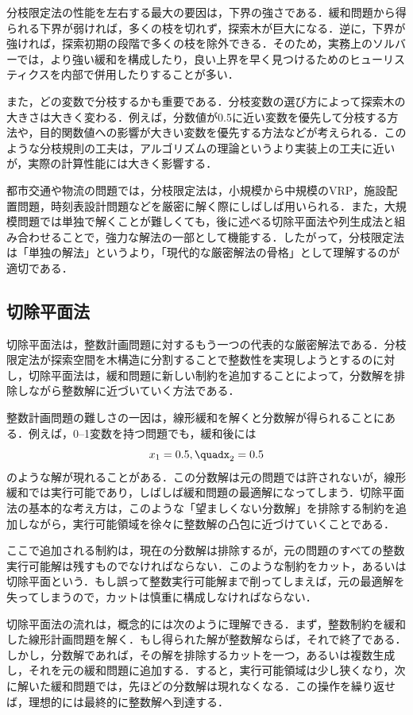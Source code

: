 分枝限定法の性能を左右する最大の要因は，下界の強さである．緩和問題から得られる下界が弱ければ，多くの枝を切れず，探索木が巨大になる．逆に，下界が強ければ，探索初期の段階で多くの枝を除外できる．そのため，実務上のソルバーでは，より強い緩和を構成したり，良い上界を早く見つけるためのヒューリスティクスを内部で併用したりすることが多い．

また，どの変数で分枝するかも重要である．分枝変数の選び方によって探索木の大きさは大きく変わる．例えば，分数値が0.5に近い変数を優先して分枝する方法や，目的関数値への影響が大きい変数を優先する方法などが考えられる．このような分枝規則の工夫は，アルゴリズムの理論というより実装上の工夫に近いが，実際の計算性能には大きく影響する．

都市交通や物流の問題では，分枝限定法は，小規模から中規模のVRP，施設配置問題，時刻表設計問題などを厳密に解く際にしばしば用いられる．また，大規模問題では単独で解くことが難しくても，後に述べる切除平面法や列生成法と組み合わせることで，強力な解法の一部として機能する．したがって，分枝限定法は「単独の解法」というより，「現代的な厳密解法の骨格」として理解するのが適切である．

\subsection{切除平面法}

切除平面法は，整数計画問題に対するもう一つの代表的な厳密解法である\cite{gomory1963}．分枝限定法が探索空間を木構造に分割することで整数性を実現しようとするのに対し，切除平面法は，緩和問題に新しい制約を追加することによって，分数解を排除しながら整数解に近づいていく方法である．

整数計画問題の難しさの一因は，線形緩和を解くと分数解が得られることにある．例えば，0--1変数を持つ問題でも，緩和後には
\begin{equation}
x_1=0.5,\quadx_2=0.5
\end{equation}
のような解が現れることがある．この分数解は元の問題では許されないが，線形緩和では実行可能であり，しばしば緩和問題の最適解になってしまう．切除平面法の基本的な考え方は，このような「望ましくない分数解」を排除する制約を追加しながら，実行可能領域を徐々に整数解の凸包に近づけていくことである．

ここで追加される制約は，現在の分数解は排除するが，元の問題のすべての整数実行可能解は残すものでなければならない．このような制約をカット，あるいは切除平面という．もし誤って整数実行可能解まで削ってしまえば，元の最適解を失ってしまうので，カットは慎重に構成しなければならない．

切除平面法の流れは，概念的には次のように理解できる．まず，整数制約を緩和した線形計画問題を解く．もし得られた解が整数解ならば，それで終了である．しかし，分数解であれば，その解を排除するカットを一つ，あるいは複数生成し，それを元の緩和問題に追加する．すると，実行可能領域は少し狭くなり，次に解いた緩和問題では，先ほどの分数解は現れなくなる．この操作を繰り返せば，理想的には最終的に整数解へ到達する．


